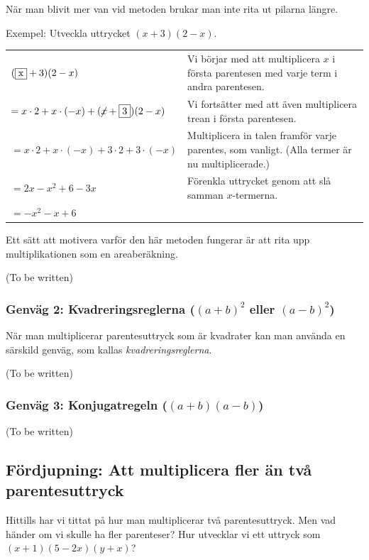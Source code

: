 När man blivit mer van vid metoden brukar man inte rita ut pilarna längre.

Exempel: Utveckla uttrycket $(x+3)(2-x)$.

\smallskip
\begin{tabular}{l|p{5.7cm}}
  $(\framebox{x}+3)(2-x)$ & Vi börjar med att multiplicera $x$ i första parentesen med varje term i andra parentesen. \\
  $= x \cdot 2 + x \cdot (-x) + (\cancel{x} + \framebox{3})(2-x)$ &  Vi fortsätter med att även multiplicera trean i första parentesen. \\
  $= x \cdot 2 + x \cdot (-x) + 3 \cdot 2 + 3 \cdot (-x)$ & Multiplicera in talen framför varje parentes, som vanligt. (Alla termer är nu multiplicerade.) \\
  $= 2x - x^2 + 6 - 3x$ & Förenkla uttrycket genom att slå samman $x$-termerna. \\
  $=-x^2 - x + 6$ & \\
\end{tabular}
\smallskip

Ett sätt att motivera varför den här metoden fungerar är att rita upp multiplikationen som en areaberäkning.

(To be written)

\subsubsection{Genväg 2: Kvadreringsreglerna ($(a+b)^2$ eller $(a-b)^2$)}

När man multiplicerar parentesuttryck som är kvadrater kan man använda en särskild genväg, som kallas \emph{kvadreringsreglerna}.

(To be written)

\subsubsection{Genväg 3: Konjugatregeln ($(a+b)(a-b)$)}

(To be written)

\subsection{Fördjupning: Att multiplicera fler än två parentesuttryck}

Hittills har vi tittat på hur man multiplicerar två parentesuttryck.
Men vad händer om vi skulle ha fler parenteser?
Hur utvecklar vi ett uttryck som $(x+1)(5-2x)(y+x)$?


